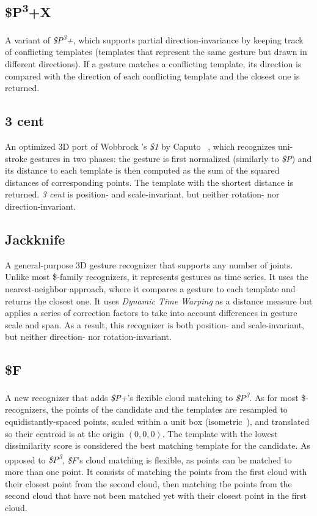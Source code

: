 \subsection{\$P\texorpdfstring{\textsuperscript{3}}{3}+X}
A variant of \textit{\$P\textsuperscript{3}+}, which supports partial direction-invariance by keeping track of conflicting templates (\ie templates that represent the same gesture but drawn in different directions). If a gesture matches a conflicting template, its direction is compared with the direction of each conflicting template and the closest one is returned.

\subsection{3 cent}
An optimized 3D port of Wobbrock \etal's \textit{\$1} \cite{Wobbrock:2007} by Caputo \etal~\cite{Caputo:2017}, which recognizes uni-stroke gestures in two phases: the gesture is first normalized (similarly to \textit{\$P}) and its distance to each template is then computed as the sum of the squared distances of corresponding points. The template with the shortest distance is returned. \textit{3 cent} is position- and scale-invariant, but neither rotation- nor direction-invariant. 

\subsection{Jackknife}
A general-purpose 3D gesture recognizer \cite{Taranta:2017} that supports any number of joints. Unlike most \$-family recognizers, it represents gestures as time series. It uses the nearest-neighbor approach, where it compares a gesture to each template and returns the closest one. It uses \textit{Dynamic Time Warping} as a distance measure but applies a series of correction factors to take into account differences in gesture scale and span. As a result, this recognizer is both position- and scale-invariant, but neither direction- nor rotation-invariant.

\subsection{\$F}    
A new recognizer that adds \textit{\$P+}'s flexible cloud matching \cite{Vatavu:2017a} to \textit{\$P\textsuperscript{3}}. As for most \$-recognizers, the points of the candidate and the templates are resampled to equidistantly-spaced points, scaled within a unit box (isometric~\cite{Vanderdonckt:2018}), and translated so their centroid is at the origin $(0,0,0)$. The template with the lowest dissimilarity score is considered the best matching template for the candidate. As opposed to \textit{\$P\textsuperscript{3}}, \textit{\$F}'s cloud matching is flexible, as points can be matched to more than one point. It consists of matching the points from the first cloud with their closest point from the second cloud, then matching the points from the second cloud that have not been matched yet with their closest point in the first cloud. 
    
